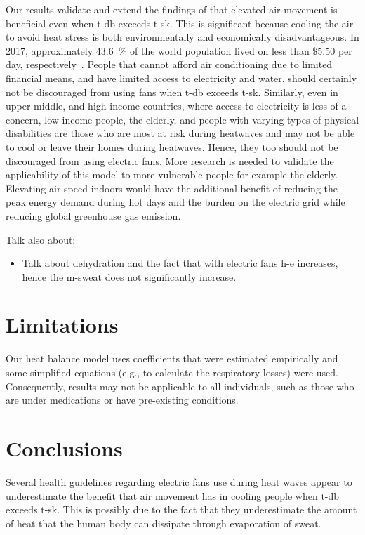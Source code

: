 Our results validate and extend the findings of  that elevated air movement is beneficial even when \ac{t-db} exceeds \acf{t-sk}.
This is significant because cooling the air to avoid heat stress is both environmentally and economically disadvantageous.
In 2017, approximately 43.6~\% of the world population lived on less than \$5.50 per day, respectively~\cite{PovertyO1:online}.
People that cannot afford air conditioning due to limited financial means, and have limited access to electricity and water, should certainly not be discouraged from using fans when \ac{t-db} exceeds \ac{t-sk}.
Similarly, even in upper-middle, and high-income countries, where access to electricity is less of a concern, low-income people, the elderly, and people with varying types of physical disabilities are those who are most at risk during heatwaves and may not be able to cool or leave their homes during heatwaves.
Hence, they too should not be discouraged from using electric fans.
More research is needed to validate the applicability of this model to more vulnerable people for example the elderly.
Elevating air speed indoors would have the additional benefit of reducing the peak energy demand during hot days and the burden on the electric grid while reducing global greenhouse gas emission.

Talk also about:
\begin{itemize}
    \item Talk about dehydration and the fact that with electric fans \ac{h-e} increases, hence the \ac{m-sweat} does not significantly increase.
\end{itemize}

\section*{Limitations}
Our heat balance model uses coefficients that were estimated empirically and some simplified equations (e.g., to calculate the respiratory losses) were used.
Consequently, results may not be applicable to all individuals, such as those who are under medications or have pre-existing conditions.

\section{Conclusions}\label{sec:conclusions}
Several health guidelines regarding electric fans use during heat waves appear to underestimate the benefit that air movement has in cooling people when \acf{t-db} exceeds \acf{t-sk}.
This is possibly due to the fact that they underestimate the amount of heat that the human body can dissipate through evaporation of sweat.

